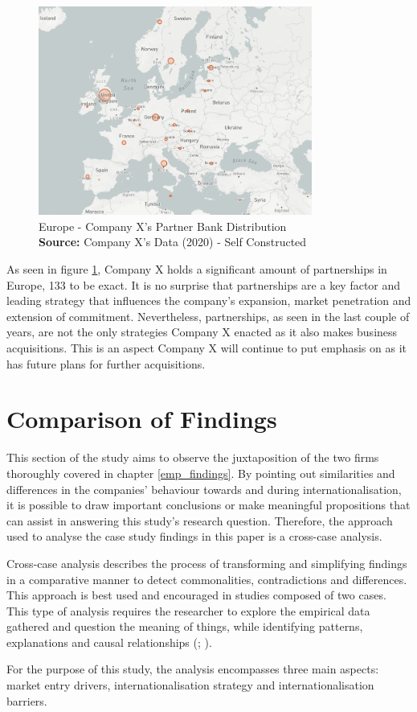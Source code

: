 \documentclass[11pt,a4paper]{article}
\newcommand*{\captionsource}[2]{%
  \caption[{#1}]{%
    #1%
    \\\hspace{\linewidth}%
    \textbf{Source:} #2%
  }%
}
\begin{document}
{{  \vspace{5mm}
\begin{figure}[H]
	\centering
  \includegraphics[width=90mm]{figures/fig_partner_dist}
  \vspace{5mm}
    \captionsetup{justification=centering,margin=2cm}
      \captionsource{Europe - Company X's Partner Bank Distribution}{Company X's Data (2020) - Self Constructed}
	\label{fig:raisin_partnerbank_dist}
\end{figure}

As seen in figure \ref{fig:raisin_partnerbank_dist}, Company X holds a significant amount of partnerships in Europe, 133 to be exact. It is no surprise that partnerships are a key factor and leading strategy that influences the company's expansion, market penetration and extension of commitment. Nevertheless, partnerships, as seen in the last couple of years, are not the only strategies Company X enacted as it also makes business acquisitions. This is an aspect Company X will continue to put emphasis on as it has future plans for further acquisitions. 

\section{Comparison of Findings}
\label{findings_comparison}
This section of the study aims to observe the juxtaposition of the two firms thoroughly covered in chapter \ref{emp_findings}. By pointing out similarities and differences in the companies' behaviour towards and during internationalisation, it is possible to draw important conclusions or make meaningful propositions that can assist in answering this study's research question. Therefore, the approach used to analyse the case study findings in this paper is a cross-case analysis. \par
Cross-case analysis describes the process of transforming and simplifying findings in a comparative manner to detect commonalities, contradictions and differences. This approach is best used and encouraged in studies composed of two cases. This type of analysis requires the researcher to explore the empirical data gathered and question the meaning of things, while identifying patterns, explanations and causal relationships (\cite{cruzesCaseStudiesSynthesis2015}; \cite{yinCaseStudyResearch2017}). \par
For the purpose of this study, the analysis encompasses three main aspects: market entry drivers, internationalisation strategy and internationalisation barriers. 

}}
\end{document}
